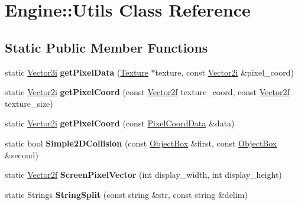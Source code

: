 \hypertarget{classEngine_1_1Utils}{}\section{Engine\+:\+:Utils Class Reference}
\label{classEngine_1_1Utils}
\subsection*{Static Public Member Functions}
\begin{DoxyCompactItemize}
\item 
\hypertarget{classEngine_1_1Utils_a82318eeb438a6bbdbd44699a3a158224}{}static \hyperlink{classVector3}{Vector3i} {\bfseries get\+Pixel\+Data} (\hyperlink{classEngine_1_1Texture}{Texture} $\ast$texture, const \hyperlink{classVector2}{Vector2i} \&pixel\+\_\+coord)\label{classEngine_1_1Utils_a82318eeb438a6bbdbd44699a3a158224}

\item 
\hypertarget{classEngine_1_1Utils_ac645b99e740f972e40a556adb3960aca}{}static \hyperlink{classVector2}{Vector2i} {\bfseries get\+Pixel\+Coord} (const \hyperlink{classVector2}{Vector2f} texture\+\_\+coord, const \hyperlink{classVector2}{Vector2f} texture\+\_\+size)\label{classEngine_1_1Utils_ac645b99e740f972e40a556adb3960aca}

\item 
\hypertarget{classEngine_1_1Utils_adcf5e0db4b080acea424bb6a7c69fa13}{}static \hyperlink{classVector2}{Vector2i} {\bfseries get\+Pixel\+Coord} (const \hyperlink{structEngine_1_1PixelCoordData}{Pixel\+Coord\+Data} \&data)\label{classEngine_1_1Utils_adcf5e0db4b080acea424bb6a7c69fa13}

\item 
\hypertarget{classEngine_1_1Utils_a4f40a197ee226d6d2fd06a18af41d99e}{}static bool {\bfseries Simple2\+D\+Collision} (const \hyperlink{structEngine_1_1ObjectBox}{Object\+Box} \&first, const \hyperlink{structEngine_1_1ObjectBox}{Object\+Box} \&second)\label{classEngine_1_1Utils_a4f40a197ee226d6d2fd06a18af41d99e}

\item 
\hypertarget{classEngine_1_1Utils_a0465696a68230562ba2468e38579bf2f}{}static \hyperlink{classVector2}{Vector2f} {\bfseries Screen\+Pixel\+Vector} (int display\+\_\+width, int display\+\_\+height)\label{classEngine_1_1Utils_a0465696a68230562ba2468e38579bf2f}

\item 
\hypertarget{classEngine_1_1Utils_a567758bcf3892463481c5cb8f804e3fe}{}static Strings {\bfseries String\+Split} (const string \&str, const string \&delim)\label{classEngine_1_1Utils_a567758bcf3892463481c5cb8f804e3fe}


\end{DoxyCompactItemize}
